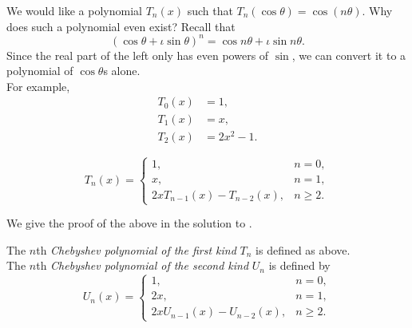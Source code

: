 	We would like a polynomial $T_n(x)$ such that $T_n(\cos\theta) = \cos(n\theta)$. Why does such a polynomial even exist? Recall that
	\[ (\cos \theta + \iota \sin \theta)^n = \cos n\theta + \iota \sin n\theta. \]
	Since the real part of the left only has even powers of $\sin$, we can convert it to a polynomial of $\cos\theta$s alone.\\
	For example,
	\begin{align*}
		T_0(x) &= 1, \\
		T_1(x) &= x, \\
		T_2(x) &= 2x^2-1.
	\end{align*}

	\begin{fprop}
		\[ T_n(x) = \begin{cases} 1, & n=0, \\ x, & n=1, \\ 2xT_{n-1}(x) - T_{n-2}(x), & n \ge 2. \end{cases} \]
	\end{fprop}
	We give the proof of the above in the solution to .


	\begin{fdef}
		The $n$th \emph{Chebyshev polynomial of the first kind} $T_n$ is defined as above.\\
		The $n$th \emph{Chebyshev polynomial of the second kind} $U_n$ is defined by
		\[ U_n(x) = \begin{cases} 1, & n=0, \\ 2x, & n=1, \\ 2xU_{n-1}(x) - U_{n-2}(x), & n \ge 2. \end{cases} \]
	\end{fdef}



